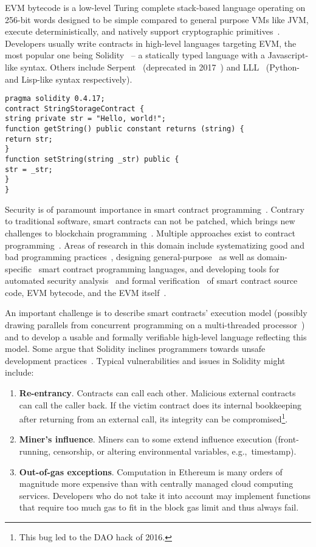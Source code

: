 EVM bytecode is a low-level Turing complete stack-based language operating on 256-bit words designed to be simple compared to general purpose VMs like JVM, execute deterministically, and natively support cryptographic primitives~\cite{Buterin2017}.
Developers usually write contracts in high-level languages targeting EVM, the most popular one being Solidity~\cite{Solidity17} -- a statically typed language with a Javascript-like syntax.
Others include Serpent~\cite{SerpentGithub} (deprecated in 2017~\cite{Castor2017}) and LLL~\cite{Ellison2017} (Python- and Lisp-like syntax respectively).

\begin{lstlisting}[language=Solidity, caption=A simple contract in Solidity]
pragma solidity 0.4.17;
contract StringStorageContract {
string private str = "Hello, world!";
function getString() public constant returns (string) {
return str;
}
function setString(string _str) public {
str = _str;
}
}
\end{lstlisting}

Security is of paramount importance in smart contract programming~\cite{Atzei2017, Delmolino2016}.
Contrary to traditional software, smart contracts can not be patched, which brings new challenges to blockchain programming~\cite{Porru2017}.
Multiple approaches exist to contract programming~\cite{Seijas2016}.
Areas of research in this domain include systematizing good and bad programming practices~\cite{ConsenSys16, Chen2017}, designing general-purpose~\cite{Hirai2017a, Buterin2017b, Pettersson2016} as well as domain-specific~\cite{Biryukov2017, EgelundMueller2017} smart contract programming languages, and developing tools for automated security analysis~\cite{Luu2016a, Tsankov2018} and formal verification~\cite{Bhargavan2016} of smart contract source code, EVM bytecode, and the EVM itself~\cite{Hirai2017}.

An important challenge is to describe smart contracts' execution model (possibly drawing parallels from concurrent programming on a multi-threaded processor~\cite{Sergey2017}) and to develop a usable and formally verifiable high-level language reflecting this model.
Some argue that Solidity inclines programmers towards unsafe development practices~\cite{ydtm2016}.
Typical vulnerabilities and issues in Solidity might include:
\begin{enumerate}
	\item \textbf{Re-entrancy}. Contracts can call each other. Malicious external contracts can call the caller back. If the victim contract does its internal bookkeeping after returning from an external call, its integrity can be compromised\footnote{This bug led to the DAO hack of 2016.}.
	\item \textbf{Miner's influence}. Miners can to some extend influence execution (front-running, censorship, or altering environmental variables, e.g.,~timestamp).
	\item \textbf{Out-of-gas exceptions}. Computation in Ethereum is many orders of magnitude more expensive than with centrally managed cloud computing services. Developers who do not take it into account may implement functions that require too much gas to fit in the block gas limit and thus always fail.
\end{enumerate}

